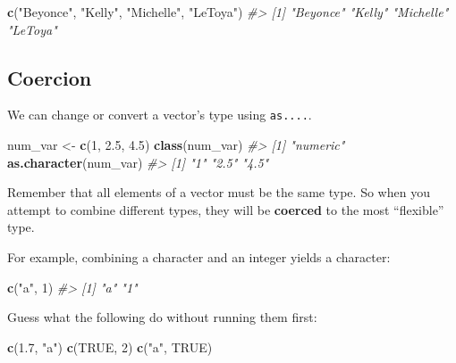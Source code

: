 \documentclass[]{book}
\newenvironment{Shaded}{\begin{snugshade}}{\end{snugshade}}
\newcommand{\CommentTok}[1]{\textcolor[rgb]{0.56,0.35,0.01}{\textit{#1}}}
\newcommand{\DecValTok}[1]{\textcolor[rgb]{0.00,0.00,0.81}{#1}}
\newcommand{\FloatTok}[1]{\textcolor[rgb]{0.00,0.00,0.81}{#1}}
\newcommand{\KeywordTok}[1]{\textcolor[rgb]{0.13,0.29,0.53}{\textbf{#1}}}
\newcommand{\NormalTok}[1]{#1}
\newcommand{\OtherTok}[1]{\textcolor[rgb]{0.56,0.35,0.01}{#1}}
\newcommand{\StringTok}[1]{\textcolor[rgb]{0.31,0.60,0.02}{#1}}
\begin{document}
\begin{Shaded}
\begin{Highlighting}[]
\KeywordTok{c}\NormalTok{(}\StringTok{"Beyonce"}\NormalTok{, }\StringTok{"Kelly"}\NormalTok{, }\StringTok{"Michelle"}\NormalTok{, }\StringTok{"LeToya"}\NormalTok{)}
\CommentTok{#> [1] "Beyonce"  "Kelly"    "Michelle" "LeToya"}
\end{Highlighting}
\end{Shaded}

\hypertarget{coercion-1}{%
\subsection{Coercion}\label{coercion-1}}

We can change or convert a vector's type using \texttt{as....}.

\begin{Shaded}
\begin{Highlighting}[]
\NormalTok{num_var <-}\StringTok{ }\KeywordTok{c}\NormalTok{(}\DecValTok{1}\NormalTok{, }\FloatTok{2.5}\NormalTok{, }\FloatTok{4.5}\NormalTok{)}
\KeywordTok{class}\NormalTok{(num_var)}
\CommentTok{#> [1] "numeric"}
\KeywordTok{as.character}\NormalTok{(num_var)}
\CommentTok{#> [1] "1"   "2.5" "4.5"}
\end{Highlighting}
\end{Shaded}

Remember that all elements of a vector must be the same type. So when you attempt to combine different types, they will be \textbf{coerced} to the most ``flexible'' type.

For example, combining a character and an integer yields a character:

\begin{Shaded}
\begin{Highlighting}[]
\KeywordTok{c}\NormalTok{(}\StringTok{"a"}\NormalTok{, }\DecValTok{1}\NormalTok{)}
\CommentTok{#> [1] "a" "1"}
\end{Highlighting}
\end{Shaded}

Guess what the following do without running them first:

\begin{Shaded}
\begin{Highlighting}[]
\KeywordTok{c}\NormalTok{(}\FloatTok{1.7}\NormalTok{, }\StringTok{"a"}\NormalTok{) }
\KeywordTok{c}\NormalTok{(}\OtherTok{TRUE}\NormalTok{, }\DecValTok{2}\NormalTok{) }
\KeywordTok{c}\NormalTok{(}\StringTok{"a"}\NormalTok{, }\OtherTok{TRUE}\NormalTok{) }
\end{Highlighting}
\end{Shaded}
\end{document}
